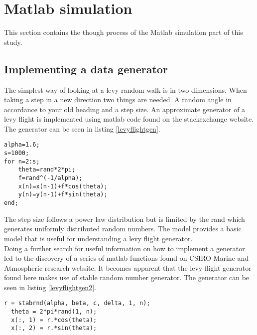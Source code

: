\section{Matlab simulation}
This section contains the though process of the Matlab simulation part of this study.
\subsection{Implementing a data generator}
The simplest way of looking at a levy random walk is in two dimensions. When taking a step in a new direction two things are needed. A random angle in accordance to your old heading and a step size. An approximate generator of a levy flight is implemented using matlab code found on the stackexchange website\cite{firstlevy}. The generator can be seen in listing \ref{levyflightgen}.
\begin{lstlisting}[caption={Approximate levy flight generator},label=levyflightgen]
alpha=1.6;
s=1000;
for n=2:s;
    theta=rand*2*pi;
    f=rand^(-1/alpha);
    x(n)=x(n-1)+f*cos(theta);
    y(n)=y(n-1)+f*sin(theta);
end;
\end{lstlisting}
The step size follows a power law distribution but is limited by the rand which generates uniformly distributed random numbers. The model provides a basic model that is useful for understanding a levy flight generator.\\
Doing a further search for useful information on how to implement a generator led to the discovery of a series of matlab functions found on CSIRO Marine and Atmospheric research website\cite{betterlevy}. It becomes apparent that the levy flight generator found here makes use of stable random number generator\cite{stabrnd}. The generator can be seen in listing \ref{levyflightgen2}.  
\begin{lstlisting}[caption={Levy flight generator using a stable random number generator},label=levyflightgen2]
  r = stabrnd(alpha, beta, c, delta, 1, n);
  theta = 2*pi*rand(1, n);
  x(:, 1) = r.*cos(theta);
  x(:, 2) = r.*sin(theta);
\end{lstlisting}